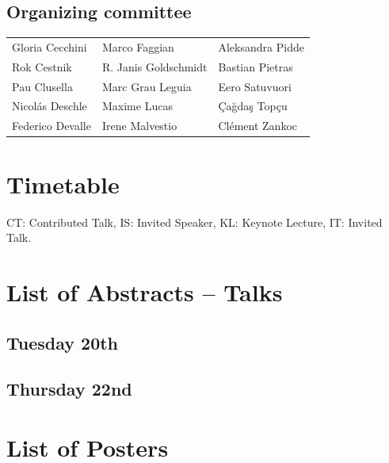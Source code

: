 \documentclass[openany, parskip=full, 12pt, a4]{scrbook}
\begin{document}
\section{Organizing committee}
\begin{center}
\begin{tabular}{lll}
Gloria Cecchini & Marco Faggian &  Aleksandra Pidde \\
Rok Cestnik & R. Janis Goldschmidt &  Bastian Pietras\\
 Pau Clusella  & Marc Grau Leguia & Eero Satuvuori \\
 Nicolás Deschle & Maxime Lucas   &  Çağdaş Topçu \\
Federico Devalle  & Irene Malvestio  & Clément Zankoc 
\end{tabular}
\end{center}



\chapter{Timetable}

CT: Contributed Talk, IS: Invited Speaker, KL: Keynote Lecture, IT: Invited Talk.


\chapter{List of Abstracts -- Talks}

\section{Tuesday 20th}








\section{Thursday 22nd}


\chapter{List of Posters} 
\end{document}
